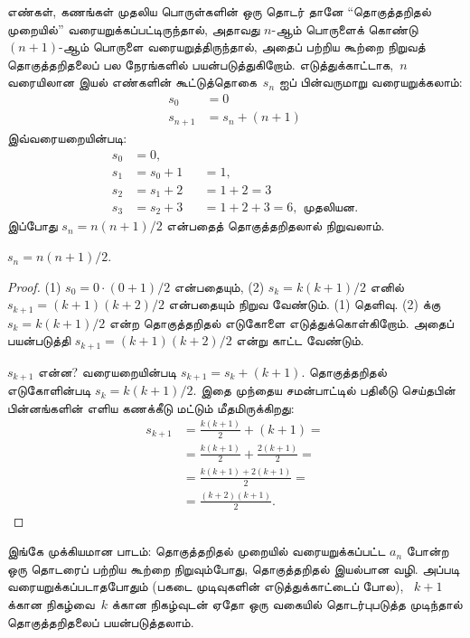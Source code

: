 \documentclass[../../../include/open-logic-section]{subfiles}
\begin{document}
எண்கள், கணங்கள் முதலிய பொருள்களின் ஒரு தொடர்
தானே ``தொகுத்தறிதல் முறையில்'' வரையறுக்கப்பட்டிருந்தால்,
அதாவது $n$-ஆம் பொருளைக் கொண்டு $(n+1)$-ஆம்
பொருளை வரையறுத்திருந்தால், அதைப் பற்றிய கூற்றை
நிறுவத் தொகுத்தறிதலைப் பல நேரங்களில் பயன்படுத்துகிறோம்.
எடுத்துக்காட்டாக,~$n$ வரையிலான இயல் எண்களின்
கூட்டுத்தொகை~$s_n$ ஐப் பின்வருமாறு வரையறுக்கலாம்:
\begin{align*}
  s_0 & = 0\\
  s_{n+1} & = s_n + (n+1)
\end{align*}
இவ்வரையறையின்படி:
\begin{align*}
  s_0 & = 0,\\
  s_1 & = s_0 + 1 && = 1,\\
  s_2 & = s_1 + 2 && = 1 + 2 = 3\\
  s_3 & = s_2 + 3 && = 1 + 2 + 3 = 6, \text{ முதலியன.}
\end{align*}
இப்போது $s_n = n(n+1)/2$ என்பதைத் தொகுத்தறிதலால்
நிறுவலாம்.

\begin{prop}
  $s_n = n(n+1)/2$.
\end{prop}

\begin{proof}
  (1) $s_0 = 0\cdot(0 + 1)/2$ என்பதையும்,
  (2) $s_k = k(k+1)/2$ எனில்
  $s_{k+1} = (k+1)(k+2)/2$ என்பதையும்
  நிறுவ வேண்டும். (1) தெளிவு. (2) க்கு
  $s_k = k(k+1)/2$ என்ற தொகுத்தறிதல்
  எடுகோளை எடுத்துக்கொள்கிறோம். அதைப் பயன்படுத்தி
  $s_{k+1} = (k+1)(k+2)/2$ என்று
  காட்ட வேண்டும்.

  $s_{k+1}$ என்ன? வரையறையின்படி
  $s_{k+1} = s_k + (k+1)$. தொகுத்தறிதல்
  எடுகோளின்படி $s_k = k(k+1)/2$. இதை
  முந்தைய சமன்பாட்டில் பதிலீடு செய்தபின் பின்னங்களின்
  எளிய கணக்கீடு மட்டும் மீதமிருக்கிறது:
  \begin{align*}
    s_{k+1} & = \frac{k(k+1)}{2} + (k+1) = {}\\
    & = \frac{k(k+1)}{2} + \frac{2(k+1)}{2} = {}\\
    & = \frac{k(k+1) + 2(k+1)}{2} = {}\\
    & = \frac{(k+2)(k+1)}{2}.
  \end{align*}
\end{proof}

இங்கே முக்கியமான பாடம்: தொகுத்தறிதல் முறையில்
வரையறுக்கப்பட்ட $a_n$ போன்ற ஒரு தொடரைப்
பற்றிய கூற்றை நிறுவும்போது, தொகுத்தறிதல்
இயல்பான வழி. அப்படி வரையறுக்கப்படாதபோதும்
(பகடை முடிவுகளின் எடுத்துக்காட்டைப் போல),
~$k+1$ க்கான நிகழ்வை~$k$ க்கான
நிகழ்வுடன் ஏதோ ஒரு வகையில் தொடர்புபடுத்த
முடிந்தால் தொகுத்தறிதலைப் பயன்படுத்தலாம்.
\end{document}
